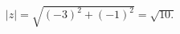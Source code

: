 \documentclass[preview]{standalone}
\begin{document}
\begin{align*}
|z| = \sqrt{   (-3)^2   +   (-1)^2  } = \sqrt{10.}
\end{align*}
\end{document}
